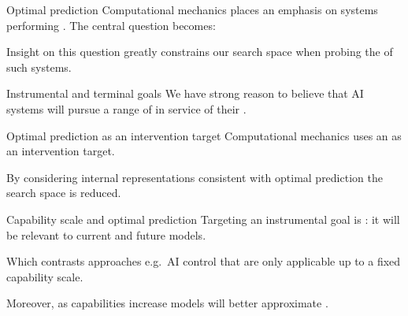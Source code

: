 \documentclass[aspectratio=169,12pt,t]{beamer}
\begin{document}
\begin{frame}{Optimal prediction}
  Computational mechanics places an emphasis on systems
  performing . The central question becomes:
  \vspace{5mm}

  {\centering
    \setlength{\fboxsep}{3mm}
    \setlength{\fboxrule}{0.6pt}
    \par}
  \vspace{5mm}

  Insight on this question greatly constrains our search space when
  probing the  of such systems.
\end{frame}

\begin{frame}{Instrumental and terminal goals}
  We have strong reason to believe that AI systems will pursue a range of
   in service of their .
  \begin{center}\end{center}
\end{frame}

\begin{frame}{Optimal prediction as an intervention target}
  Computational mechanics uses an  as an intervention target.
  \begin{center}\end{center}
  By considering internal representations consistent with optimal prediction
  the search space is reduced.
\end{frame}

\begin{frame}{Capability scale and optimal prediction}
  Targeting an instrumental goal is : it will be relevant
  to current and future models.
  \begin{center}\end{center}
  {\small
  Which contrasts  approaches e.g.\ AI control that are
  only applicable up to a fixed capability scale.

  Moreover, as capabilities increase models will better approximate
  .\par}
\end{frame}
\end{document}
